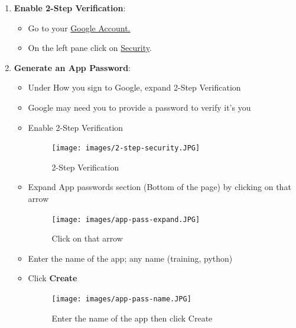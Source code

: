 \documentclass[
  letterpaper,
  DIV=11,
  numbers=noendperiod]{scrreprt}
\begin{document}
\begin{enumerate}
\def\labelenumi{\arabic{enumi}.}
\item
  \textbf{Enable 2-Step Verification}:

  \begin{itemize}
  \item
    Go to your \href{https://myaccount.google.com/}{Google Account.}
  \item
    On the left pane click on
    \href{https://myaccount.google.com/security}{Security}.
  \end{itemize}
\item
  \textbf{Generate an App Password}:

  \begin{itemize}
  \item
    Under How you sign to Google, expand 2-Step Verification
  \item
    Google may need you to provide a password to verify it's you
  \item
    Enable 2-Step Verification

    \begin{figure}[H]

    {\centering \texttt{[image: images/2-step-security.JPG]}

    }

    \caption{2-Step Verification}

    \end{figure}%
  \item
    Expand App passwords section (Bottom of the page) by clicking on
    that arrow

    \begin{figure}[H]

    {\centering \texttt{[image: images/app-pass-expand.JPG]}

    }

    \caption{Click on that arrow}

    \end{figure}%
  \item
    Enter the name of the app; any name (training, python)
  \item
    Click \textbf{Create}

    \begin{figure}[H]

    {\centering \texttt{[image: images/app-pass-name.JPG]}

    }

    \caption{Enter the name of the app then click Create}


\end{figure}
\end{itemize}
\end{enumerate}
\end{document}
